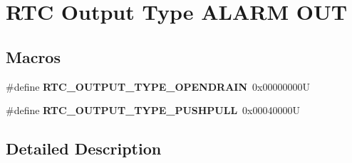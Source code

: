 \hypertarget{group___r_t_c___output___type___a_l_a_r_m___o_u_t}{}\section{R\+TC Output Type A\+L\+A\+RM O\+UT}
\label{group___r_t_c___output___type___a_l_a_r_m___o_u_t}
\subsection*{Macros}
\begin{DoxyCompactItemize}
\item 
\mbox{\label{group___r_t_c___output___type___a_l_a_r_m___o_u_t_gaa2505e0038154990024b533160bd46bd}} 
\#define {\bfseries R\+T\+C\+\_\+\+O\+U\+T\+P\+U\+T\+\_\+\+T\+Y\+P\+E\+\_\+\+O\+P\+E\+N\+D\+R\+A\+IN}~0x00000000U
\item 
\mbox{\label{group___r_t_c___output___type___a_l_a_r_m___o_u_t_ga3e0b4512d6531cb0bb428163d7bd927d}} 
\#define {\bfseries R\+T\+C\+\_\+\+O\+U\+T\+P\+U\+T\+\_\+\+T\+Y\+P\+E\+\_\+\+P\+U\+S\+H\+P\+U\+LL}~0x00040000U
\end{DoxyCompactItemize}


\subsection{Detailed Description}

